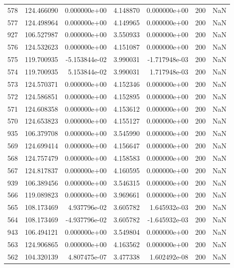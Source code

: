 \begin{tabular}{rrrrrrr}
 578 & 124.466090 &  0.000000e+00 &  4.148870 &  0.000000e+00 &         200 & NaN \\
 577 & 124.498964 &  0.000000e+00 &  4.149965 &  0.000000e+00 &         200 & NaN \\
 927 & 106.527987 &  0.000000e+00 &  3.550933 &  0.000000e+00 &         200 & NaN \\
 576 & 124.532623 &  0.000000e+00 &  4.151087 &  0.000000e+00 &         200 & NaN \\
 575 & 119.700935 & -5.153844e-02 &  3.990031 & -1.717948e-03 &         200 & NaN \\
 574 & 119.700935 &  5.153844e-02 &  3.990031 &  1.717948e-03 &         200 & NaN \\
 573 & 124.570371 &  0.000000e+00 &  4.152346 &  0.000000e+00 &         200 & NaN \\
 572 & 124.586851 &  0.000000e+00 &  4.152895 &  0.000000e+00 &         200 & NaN \\
 571 & 124.608358 &  0.000000e+00 &  4.153612 &  0.000000e+00 &         200 & NaN \\
 570 & 124.653823 &  0.000000e+00 &  4.155127 &  0.000000e+00 &         200 & NaN \\
 935 & 106.379708 &  0.000000e+00 &  3.545990 &  0.000000e+00 &         200 & NaN \\
 569 & 124.699414 &  0.000000e+00 &  4.156647 &  0.000000e+00 &         200 & NaN \\
 568 & 124.757479 &  0.000000e+00 &  4.158583 &  0.000000e+00 &         200 & NaN \\
 567 & 124.817837 &  0.000000e+00 &  4.160595 &  0.000000e+00 &         200 & NaN \\
 939 & 106.389456 &  0.000000e+00 &  3.546315 &  0.000000e+00 &         200 & NaN \\
 566 & 119.089823 &  0.000000e+00 &  3.969661 &  0.000000e+00 &         200 & NaN \\
 565 & 108.173469 &  4.937796e-02 &  3.605782 &  1.645932e-03 &         200 & NaN \\
 564 & 108.173469 & -4.937796e-02 &  3.605782 & -1.645932e-03 &         200 & NaN \\
 943 & 106.494121 &  0.000000e+00 &  3.549804 &  0.000000e+00 &         200 & NaN \\
 563 & 124.906865 &  0.000000e+00 &  4.163562 &  0.000000e+00 &         200 & NaN \\
 562 & 104.320139 &  4.807475e-07 &  3.477338 &  1.602492e-08 &         200 & NaN \\

\end{tabular}
